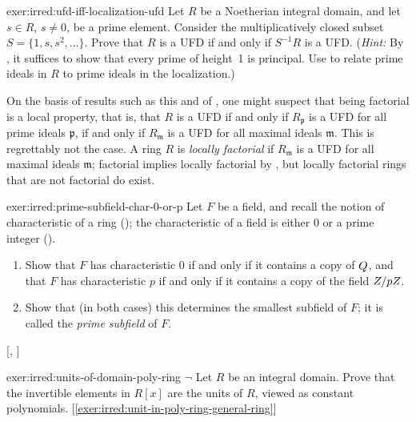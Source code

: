 \begin{exer}{}{exer:irred:ufd-iff-localization-ufd}
  Let $R$ be a Noetherian integral domain, and let $s \in R$,
  $s \neq 0$, be a prime element. Consider the multiplicatively closed
  subset $S = \{1, s, s^2, \ldots\}$. Prove that $R$ is a UFD if and
  only if $S^{-1}R$ is a UFD. (\emph{Hint:} By
  , it
  suffices to show that every prime of height~1 is principal. Use
   to relate prime
  ideals in $R$ to prime ideals in the localization.)

  On the basis of results such as this and of
  , one might suspect that
  being factorial is a local property, that is, that $R$ is a UFD if
  and only if $R_{\mathfrak{p}}$ is a UFD for all prime ideals
  $\mathfrak{p}$, if and only if $R_{\mathfrak{m}}$ is a UFD for all
  maximal ideals $\mathfrak{m}$. This is regrettably not the case. A
  ring $R$ is \emph{locally factorial} if $R_{\mathfrak{m}}$ is a UFD
  for all maximal ideals $\mathfrak{m}$; factorial implies locally
  factorial by , but
  locally factorial rings that are not factorial do exist.
\end{exer}
\begin{exer}{}{exer:irred:prime-subfield-char-0-or-p}
  \exerused Let $F$ be a field, and recall the notion of
  characteristic of a ring (); the
  characteristic of a field is either $0$ or a prime integer
  ().
  \begin{enumerate}[label=(\arabic*)]
  \item Show that $F$ has characteristic $0$ if and only if it
    contains a copy of $Q$, and that $F$ has characteristic $p$ if
    and only if it contains a copy of the field $Z/pZ$.
  \item Show that (in both cases) this determines the smallest
    subfield of $F$; it is called the \emph{prime subfield} of $F$.
  \end{enumerate}
  [,
  ]
\end{exer}
\begin{exer}{}{exer:irred:units-of-domain-poly-ring}
  $\lnot$ Let $R$ be an integral domain. Prove that the invertible
  elements in $R[x]$ are the units of $R$, viewed as constant
  polynomials. [\ref{exer:irred:unit-in-poly-ring-general-ring}]
\end{exer}
